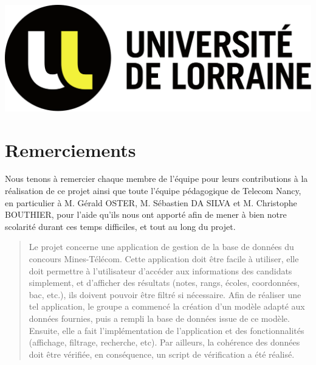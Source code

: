 \documentclass[12pt]{article}
\begin{document}
\begin{titlepage}
	\includegraphics[scale=0.12]{Images/logo/logo_UL_horizontal}\\[1 cm]

	\vfill
\end{titlepage}

\newpage
\section*{\center Remerciements}

\hskip7mm

Nous tenons à remercier chaque membre de l'équipe pour leurs contributions à la réalisation de ce projet ainsi que toute l’équipe pédagogique  de Telecom Nancy, en particulier à M. Gérald OSTER, M. Sébastien DA SILVA et M. Christophe BOUTHIER, pour l’aide qu’ils nous ont apporté afin de mener à bien notre scolarité durant ces temps difficiles, et tout au long du projet. \\

\newpage

\begin{abstract}
Le projet concerne une application de gestion de la base de données du concours Mines-Télécom. Cette application doit être facile à utiliser, elle doit permettre à l'utilisateur d'accéder aux informations des candidats simplement, et d'afficher des résultats (notes, rangs, écoles, coordonnées, bac, etc.), ils doivent pouvoir être filtré si nécessaire. Afin de réaliser une tel application, le groupe a commencé la création d'un modèle adapté aux données fournies, puis a rempli la base de données issue de ce modèle. Ensuite, elle a fait l'implémentation de l'application et des fonctionnalités (affichage, filtrage, recherche, etc). Par ailleurs, la cohérence des données doit être vérifiée, en conséquence, un script de vérification a été réalisé.
\end{abstract}
\end{document}
